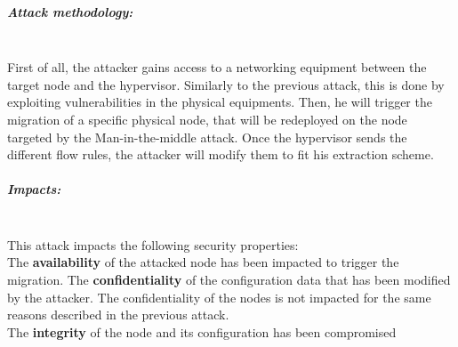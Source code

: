 \subparagraph{Attack methodology:}\textbf{\\}
First of all, the attacker gains access to a networking equipment between the target node and the hypervisor. Similarly to the previous attack, this is done by exploiting vulnerabilities in the physical equipments.
Then, he will trigger the migration of a specific physical node, that will be redeployed on the node targeted by the Man-in-the-middle attack.
Once the hypervisor sends the different flow rules, the attacker will modify them to fit his extraction scheme.

\subparagraph{Impacts:}\textbf{\\}
This attack impacts the following security properties:\\
The \textbf{availability} of the attacked node has been impacted to trigger the migration.
The \textbf{confidentiality} of the configuration data that has been modified by the attacker.
The confidentiality of the nodes is not impacted for the same reasons described in the previous attack.\\
The \textbf{integrity} of the node and its configuration has been compromised

% 
